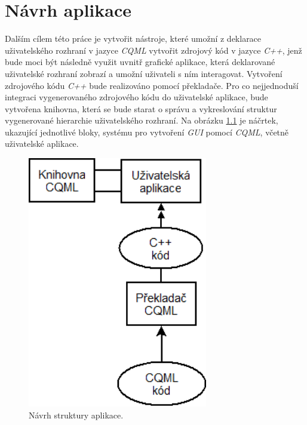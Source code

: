 \documentclass[11pt,twoside,a4paper]{book}
\begin{document}
\chapter{\label{CH:appDesign}Návrh aplikace}
Dalším cílem této práce je vytvořit nástroje, které umožní z deklarace uživatelského rozhraní v jazyce \textit{CQML} vytvořit zdrojový kód v jazyce \textit{C++}, jenž bude moci být následně využit uvnitř grafické aplikace, která deklarované uživatelské rozhraní zobrazí a umožní uživateli s ním interagovat. Vytvoření zdrojového kódu \textit{C++} bude realizováno pomocí překladače. Pro co nejjednoduší integraci vygenerovaného zdrojového kódu do uživatelské aplikace, bude vytvořena knihovna, která se bude starat o správu a vykreslování struktur vygenerované hierarchie uživatelského rozhraní. 
Na obrázku \ref{fig:structure1} je náčrtek, ukazující jednotlivé bloky, systému pro vytvoření \textit{GUI} pomocí \textit{CQML}, včetně uživatelské aplikace.  

\begin{figure}[!ht]
\begin{center}
  \includegraphics[width=0.7\textwidth]{Diagram1}
\caption{{\label{fig:structure1}}Návrh struktury aplikace.}
\end{center}
\end{figure}
\end{document}
